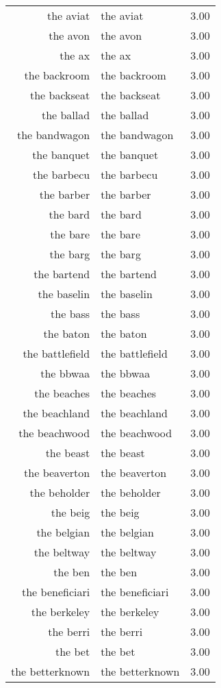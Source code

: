 \begin{table}[ht]
\begin{tabular}{rlr}
  the aviat & the aviat & 3.00 \\ 
  the avon & the avon & 3.00 \\ 
  the ax & the ax & 3.00 \\ 
  the backroom & the backroom & 3.00 \\ 
  the backseat & the backseat & 3.00 \\ 
  the ballad & the ballad & 3.00 \\ 
  the bandwagon & the bandwagon & 3.00 \\ 
  the banquet & the banquet & 3.00 \\ 
  the barbecu & the barbecu & 3.00 \\ 
  the barber & the barber & 3.00 \\ 
  the bard & the bard & 3.00 \\ 
  the bare & the bare & 3.00 \\ 
  the barg & the barg & 3.00 \\ 
  the bartend & the bartend & 3.00 \\ 
  the baselin & the baselin & 3.00 \\ 
  the bass & the bass & 3.00 \\ 
  the baton & the baton & 3.00 \\ 
  the battlefield & the battlefield & 3.00 \\ 
  the bbwaa & the bbwaa & 3.00 \\ 
  the beaches & the beaches & 3.00 \\ 
  the beachland & the beachland & 3.00 \\ 
  the beachwood & the beachwood & 3.00 \\ 
  the beast & the beast & 3.00 \\ 
  the beaverton & the beaverton & 3.00 \\ 
  the beholder & the beholder & 3.00 \\ 
  the beig & the beig & 3.00 \\ 
  the belgian & the belgian & 3.00 \\ 
  the beltway & the beltway & 3.00 \\ 
  the ben & the ben & 3.00 \\ 
  the beneficiari & the beneficiari & 3.00 \\ 
  the berkeley & the berkeley & 3.00 \\ 
  the berri & the berri & 3.00 \\ 
  the bet & the bet & 3.00 \\ 
  the betterknown & the betterknown & 3.00 \\ 

\end{tabular}
\end{table}
